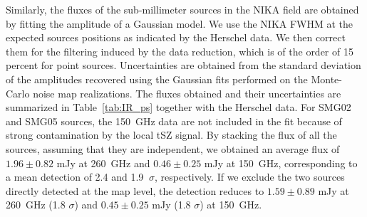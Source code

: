\documentclass[twocolumn,traditabstract]{aa}
\begin{document}
Similarly, the fluxes of the sub-millimeter sources in the NIKA field are obtained by fitting the amplitude of a Gaussian model. We use the NIKA FWHM at the expected sources positions as indicated by the Herschel data. We then correct them for the filtering induced by the data reduction, which is of the order of 15 percent for point sources. Uncertainties are obtained from the standard deviation of the amplitudes recovered using the Gaussian fits performed on the Monte-Carlo noise map realizations. The fluxes obtained and their uncertainties are summarized in Table~\ref{tab:IR_ps} together with the Herschel data. For SMG02 and SMG05 sources, the 150~GHz data are not included in the fit because of strong contamination by the local tSZ signal. By stacking the flux of all the sources, assuming that they are independent, we obtained an average flux of $1.96 \pm 0.82$ mJy at 260~GHz and $0.46 \pm 0.25$ mJy at 150~GHz, corresponding to a mean detection of 2.4 and 1.9 $ \ \sigma$, respectively. If we exclude the two sources directly detected at the map level, the detection reduces to $1.59 \pm 0.89$ mJy at 260~GHz (1.8 $\sigma$) and $0.45 \pm 0.25$ mJy (1.8 $\sigma$) at 150~GHz.
\end{document}
